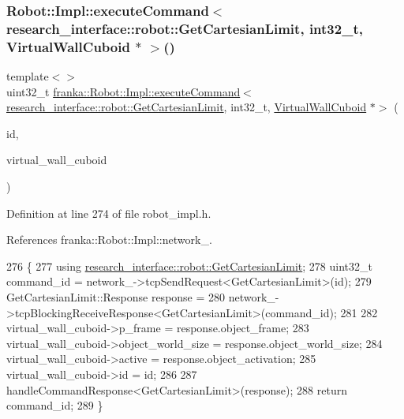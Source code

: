 \subsubsection{\texorpdfstring{Robot\+::\+Impl\+::execute\+Command$<$ research\+\_\+interface\+::robot\+::\+Get\+Cartesian\+Limit, int32\+\_\+t, Virtual\+Wall\+Cuboid $\ast$ $>$()}{Robot::Impl::executeCommand< research\_interface::robot::GetCartesianLimit, int32\_t, VirtualWallCuboid * >()}}
{\footnotesize\ttfamily template$<$$>$ \\
uint32\+\_\+t \hyperlink{classfranka_1_1Robot_1_1Impl_a6e018e65fddf90613219c2935327f80f}{franka\+::\+Robot\+::\+Impl\+::execute\+Command}$<$ \hyperlink{structresearch__interface_1_1robot_1_1GetCartesianLimit}{research\+\_\+interface\+::robot\+::\+Get\+Cartesian\+Limit}, int32\+\_\+t, \hyperlink{structfranka_1_1VirtualWallCuboid}{Virtual\+Wall\+Cuboid} $\ast$$>$ (\begin{DoxyParamCaption}\item[{int32\+\_\+t}]{id,  }\item[{\hyperlink{structfranka_1_1VirtualWallCuboid}{Virtual\+Wall\+Cuboid} $\ast$}]{virtual\+\_\+wall\+\_\+cuboid }\end{DoxyParamCaption})\hspace{0.3cm}{\ttfamily [inline]}}



Definition at line 274 of file robot\+\_\+impl.\+h.



References franka\+::\+Robot\+::\+Impl\+::network\+\_\+.


\begin{DoxyCode}
276                                                 \{
277   \textcolor{keyword}{using} \hyperlink{structresearch__interface_1_1robot_1_1GetCartesianLimit}{research\_interface::robot::GetCartesianLimit};
278   uint32\_t command\_id = network\_->tcpSendRequest<GetCartesianLimit>(id);
279   GetCartesianLimit::Response response =
280       network\_->tcpBlockingReceiveResponse<GetCartesianLimit>(command\_id);
281 
282   virtual\_wall\_cuboid->p\_frame = response.object\_frame;
283   virtual\_wall\_cuboid->object\_world\_size = response.object\_world\_size;
284   virtual\_wall\_cuboid->active = response.object\_activation;
285   virtual\_wall\_cuboid->id = id;
286 
287   handleCommandResponse<GetCartesianLimit>(response);
288   \textcolor{keywordflow}{return} command\_id;
289 \}
\end{DoxyCode}
\mbox{\label{namespacefranka_a4117308d6f88c238559eb727c0329013}} 
